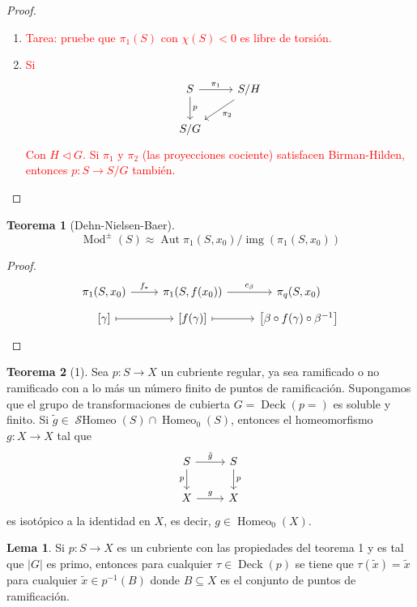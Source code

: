\documentclass[spanish]{article}
\theoremstyle{definition}
\newtheorem*{lema}{Lema}
\newtheorem*{teo}{Teorema}
\DeclareMathOperator{\Id}{Id}
\DeclareMathOperator{\img}{img}
\DeclareMathOperator{\Mod}{Mod}
\DeclareMathOperator{\Homeo}{Homeo}
\DeclareMathOperator{\Deck}{Deck}
\DeclareMathOperator{\SHomeo}{\mathcal{S}Homeo}
\begin{document}
\begin{proof}
\begin{enumerate}
		Esta afirmación nos lleva a una contradicción, pues supusimos que $\tau\in\Deck\backslash\{\Id\}$.
		\item \textcolor{red}{Tarea: pruebe que $\pi_1(S)$ con $\chi(S)<0$ es libre de torsión.}
		\item \textcolor{red}{Si}
		\[\begin{tikzcd}
			S\arrow[d,"p"]\arrow[r,"\pi_1"]&S/H\arrow[dl,"\pi_2"]\\
			S/G
		\end{tikzcd}\]
	\textcolor{red}{Con $H\triangleleft G$. Si $\pi_1$ y $\pi_2$ (las proyecciones cociente) satisfacen Birman-Hilden, entonces $p:S\to S/G$ también.}
	\end{enumerate}
\end{proof}
\begin{teo}[Dehn-Nielsen-Baer]
	\[\Mod^\pm(S)\approx\operatorname{Aut}\pi_1(S,x_0)\Big/\img(\pi_1(S,x_0))\]
\end{teo}
\begin{proof}
		\[\begin{tikzcd}[row sep=tiny]
		\pi_1(S,x_0)\arrow[r,"f_*"]&\pi_1(S,f(x_0))\arrow[r,"c_\beta"]&\pi_q(S,x_0)\\
		\left[\gamma\right]\arrow[r,maps to]&\left[f(\gamma)\right]\arrow[r,maps to]&\left[\beta\circ f(\gamma)\circ \beta^{-1}\right]
	\end{tikzcd}\]
\end{proof}

\begin{teo}[1]
	Sea $p:S\to X$ un cubriente regular, ya sea ramificado o no ramificado con a lo más un número finito de puntos de ramificación. Supongamos que el grupo de transformaciones de cubierta $G=\Deck(p=)$ es soluble y finito. Si $\tilde{g}\in\SHomeo(S)\cap\Homeo_0(S)$, entonces el homeomorfismo $g:X\to X$ tal que
	\[\begin{tikzcd}
		S\arrow[r,"\tilde{g}"]\arrow[swap,d,"p"]&S\arrow[d,"p"]\\
		X\arrow[r,"g"]&X
	\end{tikzcd}\]
	es isotópico a la identidad en $X$, es decir, $g\in\Homeo_0(X)$.
\end{teo}
\begin{lema}
	Si $p:S\to X$ es un cubriente con las propiedades del teorema 1 y es tal que $|G|$ es primo, entonces para cualquier $\tau\in\Deck(p)$ se tiene que $\tau(\tilde{x})=\tilde{x}$ para cualquier $\tilde{x}\in p^{-1}(B)$ donde $B\subseteq X$ es el conjunto de puntos de ramificación.
\end{lema}
\end{document}

